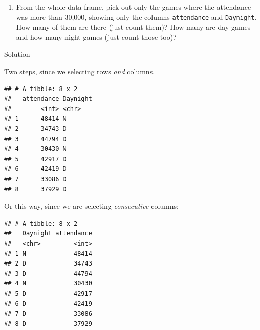 \documentclass[]{tufte-book}
\newenvironment{Shaded}{}{}
\newcommand{\DecValTok}[1]{\textcolor[rgb]{0.25,0.63,0.44}{#1}}
\newcommand{\KeywordTok}[1]{\textcolor[rgb]{0.00,0.44,0.13}{\textbf{#1}}}
\newcommand{\NormalTok}[1]{#1}
\newcommand{\OperatorTok}[1]{\textcolor[rgb]{0.40,0.40,0.40}{#1}}
\newcommand{\StringTok}[1]{\textcolor[rgb]{0.25,0.44,0.63}{#1}}
\providecommand{\tightlist}{%
  \setlength{\itemsep}{0pt}\setlength{\parskip}{0pt}}
\theoremstyle{definition}
\theoremstyle{definition}
\theoremstyle{definition}
\theoremstyle{remark}
\begin{document}
\begin{enumerate}
\def\labelenumi{(\alph{enumi})}
\setcounter{enumi}{2}
\tightlist
\item
  From the whole data frame, pick out only the games where the
  attendance was more than 30,000, showing only the columns
  \texttt{attendance} and \texttt{Daynight}. How many of them are there
  (just count them)? How many are day games and how many night games
  (just count those too)?
\end{enumerate}

Solution

Two steps, since we selecting rows \emph{and} columns.

\begin{Shaded}
\end{Shaded}

\begin{verbatim}
## # A tibble: 8 x 2
##   attendance Daynight
##        <int> <chr>   
## 1      48414 N       
## 2      34743 D       
## 3      44794 D       
## 4      30430 N       
## 5      42917 D       
## 6      42419 D       
## 7      33086 D       
## 8      37929 D
\end{verbatim}

Or this way, since we are selecting \emph{consecutive} columns:

\begin{Shaded}
\end{Shaded}

\begin{verbatim}
## # A tibble: 8 x 2
##   Daynight attendance
##   <chr>         <int>
## 1 N             48414
## 2 D             34743
## 3 D             44794
## 4 N             30430
## 5 D             42917
## 6 D             42419
## 7 D             33086
## 8 D             37929
\end{verbatim}
\end{document}
